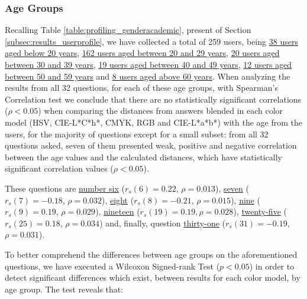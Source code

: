 \subsubsection{Age Groups}
\label{subsubsec:demo_age}
%
Recalling Table \ref{table:profiling_genderacademic}, present of Section \ref{subsec:results_userprofile}, we have collected a total of 259 users, being \ul{38 users aged below 20 years}, \ul{162 users aged between 20 and 29 years}, \ul{20 users aged between 30 and 39 years},
\ul{19 users aged between 40 and 49 years}, \ul{12 users aged between 50 and 59 years} and \ul{8 users aged above 60 years}. When analyzing the results from all 32 questions, for each of these age groups, with Spearman's Correlation test we conclude that there are no statistically
significant correlations ($\rho < 0.05$) when comparing the distances from answers blended in each color model (HSV, CIE-L*C*h*, CMYK, RGB and CIE-L*a*b*) with the age from the users, for the majority of questions except for a small subset: from all 32 questions asked, seven of them presented weak,
positive and negative correlation between the age values and the calculated distances, which have statistically significant correlation values ($\rho < 0.05$). \par
%
These questions are \ul{number six} ($r_s(6) = 0.22$, $\rho = 0.013$), \ul{seven} ($r_s(7) = -0.18$, $\rho = 0.032$), \ul{eight} ($r_s(8) = -0.21$, $\rho = 0.015$), \ul{nine} ($r_s(9) = 0.19$, $\rho = 0.029$), \ul{nineteen} ($r_s(19) = 0.19, \rho = 0.028$), \ul{twenty-five}
($r_s(25) = 0.18$, $\rho = 0.034$) and, finally, question \ul{thirty-one} ($r_s(31) = -0.19$, $\rho = 0.031$). \par
%
To better comprehend the differences between age groups on the aforementioned questions, we have executed a Wilcoxon Signed-rank Test ($p < 0.05$) in order to detect significant differences which exist, between results for each color model, by age group. The test reveals that:
%
